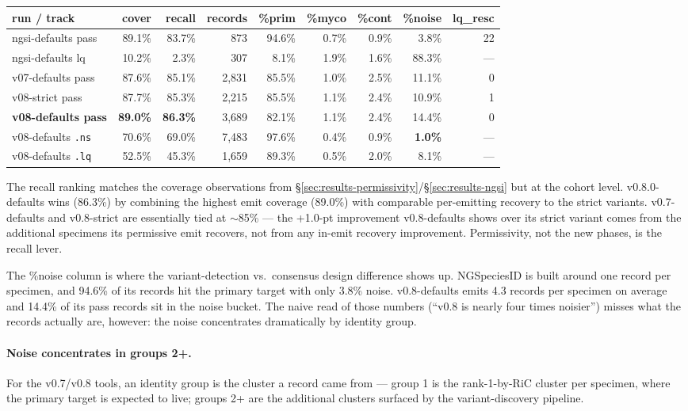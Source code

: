 \documentclass[11pt]{article}
\begin{document}
\begin{center}
\begin{tabular}{lrrrrrrrr}
\toprule
run / track & cover & recall & records & \%prim & \%myco & \%cont & \%noise & lq\_resc \\
\midrule
ngsi-defaults pass     & 89.1\% & 83.7\% &   873 & 94.6\% & 0.7\% & 0.9\% &  3.8\% & 22 \\
ngsi-defaults lq       & 10.2\% &  2.3\% &   307 &  8.1\% & 1.9\% & 1.6\% & 88.3\% & --- \\
v07-defaults pass      & 87.6\% & 85.1\% & 2,831 & 85.5\% & 1.0\% & 2.5\% & 11.1\% &  0 \\
v08-strict pass        & 87.7\% & 85.3\% & 2,215 & 85.5\% & 1.1\% & 2.4\% & 10.9\% &  1 \\
\textbf{v08-defaults pass} & \textbf{89.0\%} & \textbf{86.3\%} & 3,689 & 82.1\% & 1.1\% & 2.4\% & 14.4\% &  0 \\
v08-defaults \texttt{.ns}  & 70.6\% & 69.0\% & 7,483 & 97.6\% & 0.4\% & 0.9\% & \textbf{1.0\%} & --- \\
v08-defaults \texttt{.lq}  & 52.5\% & 45.3\% & 1,659 & 89.3\% & 0.5\% & 2.0\% &  8.1\% & --- \\
\bottomrule
\end{tabular}
\end{center}

The recall ranking matches the coverage observations from
§\ref{sec:results-permissivity}/§\ref{sec:results-ngsi} but at the
cohort level. v0.8.0-defaults wins (86.3\%) by combining the highest
emit coverage (89.0\%) with comparable per-emitting recovery to the
strict variants. v0.7-defaults and v0.8-strict are essentially tied at
$\sim$85\% --- the +1.0-pt improvement v0.8-defaults shows over its
strict variant comes from the additional specimens its permissive
emit recovers, not from any in-emit recovery improvement. Permissivity,
not the new phases, is the recall lever.

The \%noise column is where the variant-detection vs.\ consensus design
difference shows up. NGSpeciesID is built around one record per
specimen, and 94.6\% of its records hit the primary target with only
3.8\% noise. v0.8-defaults emits 4.3 records per specimen on average
and 14.4\% of its pass records sit in the noise bucket. The naive read
of those numbers (``v0.8 is nearly four times noisier'') misses what
the records actually are, however: the noise concentrates dramatically
by identity group.

\paragraph{Noise concentrates in groups 2+.}
For the v0.7/v0.8 tools, an identity group is the cluster a record
came from --- group 1 is the rank-1-by-RiC cluster per specimen, where
the primary target is expected to live; groups 2+ are the additional
clusters surfaced by the variant-discovery pipeline.
\end{document}
